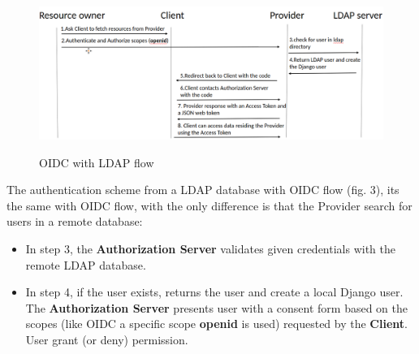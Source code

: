 \begin{figure}[htb]
	\centering
	\includegraphics[scale=0.3]{figures/LDAP.png}\\
	\caption{OIDC with LDAP flow}
\end{figure}

The authentication scheme from a LDAP database with OIDC flow (fig. 3), its the same with OIDC flow, with the only difference is that the Provider search for users in a remote database:

\begin{itemize}

	
	\item In step 3, the \textbf{Authorization Server }validates given credentials with the remote LDAP database. 
	
	\item In step 4, if the user exists, returns the user and create a local Django user. The \textbf{Authorization Server} presents user with a consent form based on the scopes (like OIDC a specific scope \textbf{openid} is used) requested by the \textbf{Client}. User grant (or deny) permission.
	
	
\end{itemize}


